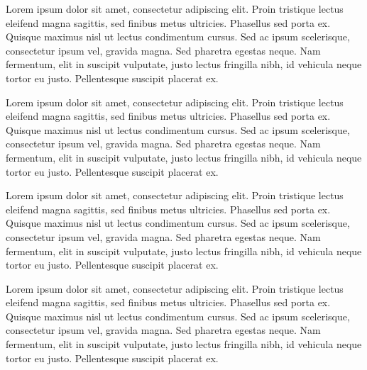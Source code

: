 
\def\lorem{Lorem ipsum dolor sit amet, consectetur adipiscing elit.
Proin tristique lectus eleifend magna sagittis, sed finibus metus
ultricies. Phasellus sed porta ex. Quisque maximus nisl ut lectus
condimentum cursus. Sed ac ipsum scelerisque, consectetur ipsum vel,
gravida magna. Sed pharetra egestas neque. Nam fermentum, elit in
suscipit vulputate, justo lectus fringilla nibh, id vehicula neque
tortor eu justo. Pellentesque suscipit placerat ex.}

\lorem

{
  \lorem\par
}

\lorem

{
  \lorem\par
}


\bye
